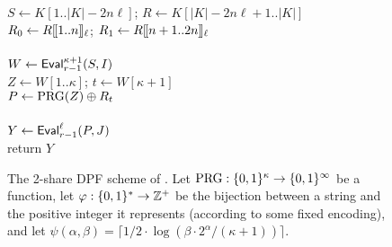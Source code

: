 \begin{figure}
{      $S \gets K[1..|K|-2n\ell]$;
      $R \gets K[|K|-2n\ell+1..|K|]$\\
      $R_0 \gets {R[\hspace*{-1.1pt}[1..n]\hspace*{-1.1pt}]_{\ell}}$;
      $R_1 \gets {R[\hspace*{-1.1pt}[n+1..2n]\hspace*{-1.1pt}]_{\ell}}$\\
      \\
      $W \gets \mathsf{Eval}_{r-1}^{\kappa+1}(S, I)$\\
      $Z \gets W[1..\kappa]$; $t \gets W[\kappa+1]$\\
      $P \gets \textup{PRG}(Z) \mathbin{\oplus} R_t$\\
      \\
      $Y \gets \mathsf{Eval}_{r-1}^\ell(P, J)$\\
      return $Y$
  }
  \caption{The 2-share DPF scheme of \cite{dpf}.
  Let $\textup{PRG} : \{0,1\}^\kappa \to \{0,1\}^\infty$ be a function,
  let $\varphi : \{0,1\}^* \to \mathbb{Z}^+$ be the bijection between a string and the
  positive integer it represents (according to some fixed encoding), and let
  $\psi(\alpha,\beta) = \lceil 1/2 \cdot
  \log({\beta\cdot2^{\alpha}}/{(\kappa+1)}) \rceil$.
  }
  \label{fig-two-dpf}
\end{figure}
